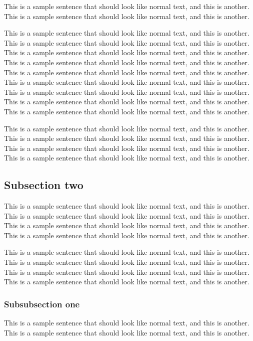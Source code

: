 \documentclass[officiallayout]{tktla}
\begin{document}
This is a sample sentence that should look like normal text, and this
is another. This is a sample sentence that should look like normal
text, and this is another.

This is a sample sentence that should look like normal text, and this
is another. This is a sample sentence that should look like normal
text, and this is another. This is a sample sentence that should look
like normal text, and this is another. This is a sample sentence that
should look like normal text, and this is another. This is a sample
sentence that should look like normal text, and this is another. This
is a sample sentence that should look like normal text, and this is
another. This is a sample sentence that should look like normal text,
and this is another. This is a sample sentence that should look like
normal text, and this is another. This is a sample sentence that
should look like normal text, and this is another.

This is a sample sentence that should look like normal text, and this
is another. This is a sample sentence that should look like normal
text, and this is another. This is a sample sentence that should look
like normal text, and this is another. This is a sample sentence that
should look like normal text, and this is another.

\subsection{Subsection two}

This is a sample sentence that should look like normal text, and this
is another. This is a sample sentence that should look like normal
text, and this is another. This is a sample sentence that should look
like normal text, and this is another. This is a sample sentence that
should look like normal text, and this is another.

This is a sample sentence that should look like normal text, and this
is another. This is a sample sentence that should look like normal
text, and this is another. This is a sample sentence that should look
like normal text, and this is another. This is a sample sentence that
should look like normal text, and this is another.

\subsubsection{Subsubsection one}

This is a sample sentence that should look like normal text, and this
is another. This is a sample sentence that should look like normal
text, and this is another.
\end{document}
